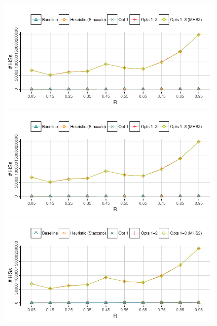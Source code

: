 \begin{figure}[!ht]
  \includegraphics[trim=0.5em 2.65em 1em 0em, clip, page=5]{figures/mhs2/figures/optim_large}
  \\[0.3em]
  \includegraphics[trim=0.5em 2.65em 1em 4em, clip, page=4]{figures/mhs2/figures/optim_large}
  \\[0.3em]
  \includegraphics[trim=0.5em 2.65em 1em 4em, clip, page=2]{figures/mhs2/figures/optim_large}
  \\[0.3em]

\end{figure}
